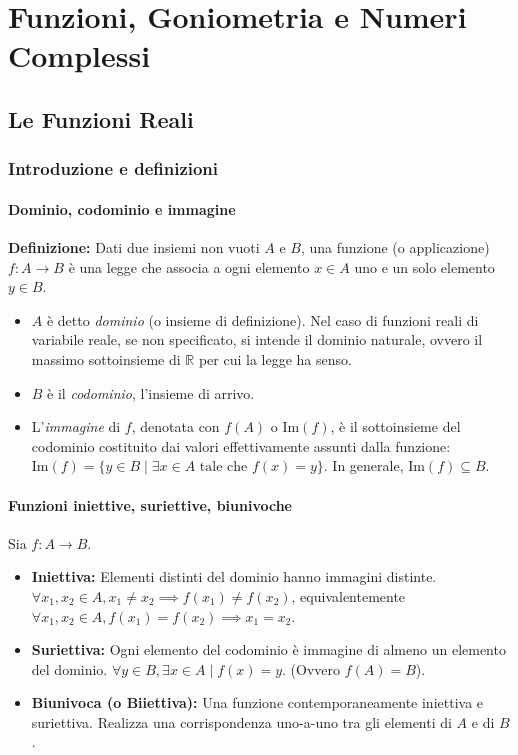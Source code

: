 \chapter{Funzioni, Goniometria e Numeri Complessi}

\section{Le Funzioni Reali}
\subsection{Introduzione e definizioni}
\subsubsection{Dominio, codominio e immagine}
\textbf{Definizione:} Dati due insiemi non vuoti $A$ e $B$, una funzione (o applicazione) $f: A \to B$ è una legge che associa a ogni elemento $x \in A$ uno e un solo elemento $y \in B$.
\begin{itemize}
    \item $A$ è detto \textit{dominio} (o insieme di definizione). Nel caso di funzioni reali di variabile reale, se non specificato, si intende il dominio naturale, ovvero il massimo sottoinsieme di $\mathbb{R}$ per cui la legge ha senso.
    \item $B$ è il \textit{codominio}, l'insieme di arrivo.
    \item L'\textit{immagine} di $f$, denotata con $f(A)$ o $\text{Im}(f)$, è il sottoinsieme del codominio costituito dai valori effettivamente assunti dalla funzione: $\text{Im}(f) = \{y \in B \mid \exists x \in A \text{ tale che } f(x) = y\}$. In generale, $\text{Im}(f) \subseteq B$.
\end{itemize}

\subsubsection{Funzioni iniettive, suriettive, biunivoche}
Sia $f: A \to B$.
\begin{itemize}
    \item \textbf{Iniettiva:} Elementi distinti del dominio hanno immagini distinte. $\forall x_1, x_2 \in A, x_1 \neq x_2 \implies f(x_1) \neq f(x_2)$, equivalentemente $\forall x_1, x_2 \in A, f(x_1) = f(x_2) \implies x_1 = x_2$.
    \item \textbf{Suriettiva:} Ogni elemento del codominio è immagine di almeno un elemento del dominio. $\forall y \in B, \exists x \in A \mid f(x) = y$. (Ovvero $f(A) = B$).
    \item \textbf{Biunivoca (o Biiettiva):} Una funzione contemporaneamente iniettiva e suriettiva. Realizza una corrispondenza uno-a-uno tra gli elementi di $A$ e di $B$.
\end{itemize}

